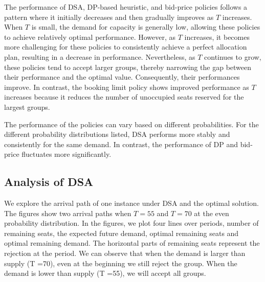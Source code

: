 The performance of DSA, DP-based heuristic, and bid-price policies follows a pattern where it initially decreases and then gradually improves as $T$ increases. When $T$ is small, the demand for capacity is generally low, allowing these policies to achieve relatively optimal performance. However, as $T$ increases, it becomes more challenging for these policies to consistently achieve a perfect allocation plan, resulting in a decrease in performance. Nevertheless, as $T$ continues to grow, these policies tend to accept larger groups, thereby narrowing the gap between their performance and the optimal value. Consequently, their performances improve. In contrast, the booking limit policy shows improved performance as $T$ increases because it reduces the number of unoccupied seats reserved for the largest groups. 


The performance of the policies can vary based on different probabilities. For the different probability distributions listed, DSA performs more stably and consistently for the same demand. In contrast, the performance of DP and bid-price fluctuates more significantly.


\subsection*{Analysis of DSA}
We explore the arrival path of one instance under DSA and the optimal solution. The figures show two arrival paths when $T= 55$ and $T= 70$ at the even probability distribution. In the figures, we plot four lines over periods, number of remaining seats, the expected future demand, optimal remaining seats and optimal remaining demand. The horizontal parts of remaining seats represent the rejection at the period. We can observe that when the demand is larger than supply (T =70), even at the beginning we still reject the group. When the demand is lower than supply (T =55), we will accept all groups.


